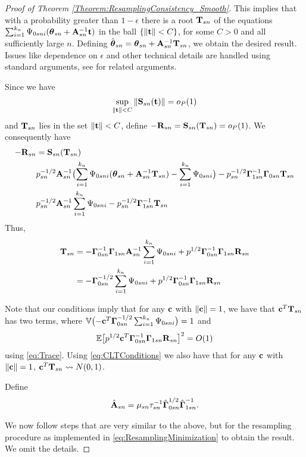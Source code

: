 \begin{proof}[Proof of Theorem \ref{Theorem:ResamplingConsistency_Smooth}]
This implies that with a probability greater than $1 - \epsilon$ there is a root ${\mathbf{T}}_{ s n}$ of the equations $\sum_{i = 1}^{ k_{n}} \Psi_{0 s n i} ({\boldsymbol{\theta}}_{ s n} +  {\mathbf{A}}_{ s n}^{-1} {\bf{t}})$  in the ball $\{ \| {\bf{t}} \| < C \}$, for some $C > 0$ and all sufficiently large $n$. Defining $\hat{{\boldsymbol{\theta}}}_{ s n}  = {\boldsymbol{\theta}}_{ s n} +   {\mathbf{A}}_{ s n}^{-1} {\mathbf{T}}_{s n}$, we obtain the desired result. Issues like dependence on $\epsilon$ and other technical details are handled using standard arguments, see \cite{ChatterjeeBose05} for related arguments.

Since we have
%
 \begin{align} 
 \sup_{\| {\bf{t}} \| < C} \| {\mathbf{S}}_{s n} ({\bf{t}}) \| = o_{P} (1) 
 \end{align} 
%
and ${\mathbf{T}}_{s n}$ lies in the set $\| {\bf{t}} \| < C$, define $- {\mathbf{R}}_{s n} = {\mathbf{S}}_{s n} ( {\mathbf{T}}_{s n}) = o_{P} (1)$. We consequently have 
 \begin{align} 
- {\mathbf{R}}_{s n} & =  {\mathbf{S}}_{s n} ( {\mathbf{T}}_{s n})  \notag\\
& 
 p_{s n}^{-1/2} {\mathbf{A}}_{ s n}^{-1} \bigl( \sum_{i = 1}^{ k_{n}} \Psi_{0 s n i} 
({\boldsymbol{\theta}}_{ s n} + {\mathbf{A}}_{ s n}^{-1} {\mathbf{T}}_{s n}) 
- \sum_{i = 1}^{ k_{n}} \Psi_{0 s n i}  \bigr) 
- p_{s n}^{-1/2}  {\boldsymbol{\Gamma}}_{1 s n }^{-1} {\boldsymbol{\Gamma}}_{0 s n }{\mathbf{T}}_{s n} \notag\\
& 
 p_{s n}^{-1/2} {\mathbf{A}}_{ s n}^{-1} \sum_{i = 1}^{ k_{n}} \Psi_{0 s n i} 
- p_{s n}^{-1/2}  {\boldsymbol{\Gamma}}_{1 s n }^{-1} {\mathbf{T}}_{s n} 
\end{align}
Thus, 
\begin{align} 
{\mathbf{T}}_{s n} & = 
-  {\boldsymbol{\Gamma}}_{0 s n }^{-1} {\boldsymbol{\Gamma}}_{1 s n } 
{\mathbf{A}}_{ s n}^{-1}  \sum_{i = 1}^{ k_{n}} \Psi_{0 s n i} 
+ p^{1/2} {\boldsymbol{\Gamma}}_{0 s n }^{-1} {\boldsymbol{\Gamma}}_{1 s n } {\mathbf{R}}_{s n} \notag\\
& = 
-  {\boldsymbol{\Gamma}}_{0 s n }^{-1/2}  \sum_{i = 1}^{ k_{n}} \Psi_{0 s n i} 
+ p^{1/2} {\boldsymbol{\Gamma}}_{0 s n }^{-1} {\boldsymbol{\Gamma}}_{1 s n } {\mathbf{R}}_{s n}
\end{align}

Note that our conditions imply that for any ${\bf{c}}$ with $\| {\bf{c}} \| =1$, we have that 
 ${\bf{c}}^T {\mathbf{T}}_{s n}$ has two terms, where 
 ${\mathbb{V}} \bigl( - {\bf{c}}^T {\boldsymbol{\Gamma}}_{0 s n }^{-1/2}  \sum_{i = 1}^{ k_{n}} \Psi_{0 s n i} 
 \bigr) = 1$ and 
 \begin{align} 
 {\mathbb{E}} 
 \bigl[ p^{1/2} {\bf{c}}^T {\boldsymbol{\Gamma}}_{0 s n }^{-1} {\boldsymbol{\Gamma}}_{1 s n } {\mathbf{R}}_{s n} 
 \bigr]^{2} = O(1)
\end{align} 
using \ref{eq:Trace}. Using \ref{eq:CLTConditions} we also have that for any ${\bf{c}}$ with $\| {\bf{c}}\| = 1$, ${\bf{c}}^T {\mathbf{T}}_{s n} \leadsto N (0, 1)$. 

Define 
\begin{align} 
\hat{{\mathbf{A}}}_{s n} = \mu_{s n} \tau_{s n}^{-1} \hat{{\boldsymbol{\Gamma}}}_{0 s n}^{1/2}
\hat{{\boldsymbol{\Gamma}}}_{1 s n}^{-1}.
\end{align}

We now follow steps that are very similar to the above, but for the resampling procedure as implemented in \ref{eq:ResamplingMinimization} to obtain the result. We omit the details. 
 
\end{proof}

